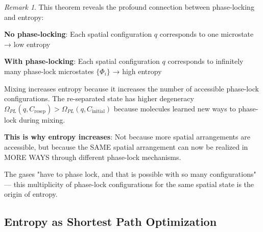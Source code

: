 \documentclass[12pt,a4paper]{article}
\theoremstyle{remark}
\newtheorem{remark}[theorem]{Remark}
\begin{document}
\begin{remark}
This theorem reveals the profound connection between phase-locking and entropy:

\textbf{No phase-locking}: Each spatial configuration $q$ corresponds to one microstate → low entropy

\textbf{With phase-locking}: Each spatial configuration $q$ corresponds to infinitely many phase-lock microstates $\{\Phi_i\}$ → high entropy

Mixing increases entropy because it increases the number of accessible phase-lock configurations. The re-separated state has higher degeneracy $\Omega_{PL}(q, C_{\text{resep}}) > \Omega_{PL}(q, C_{\text{initial}})$ because molecules learned new ways to phase-lock during mixing.

\textbf{This is why entropy increases}: Not because more spatial arrangements are accessible, but because the SAME spatial arrangement can now be realized in MORE WAYS through different phase-lock mechanisms.

The gases "have to phase lock, and that is possible with so many configurations" — this multiplicity of phase-lock configurations for the same spatial state is the origin of entropy.
\end{remark}

\subsection{Entropy as Shortest Path Optimization}
\end{document}
